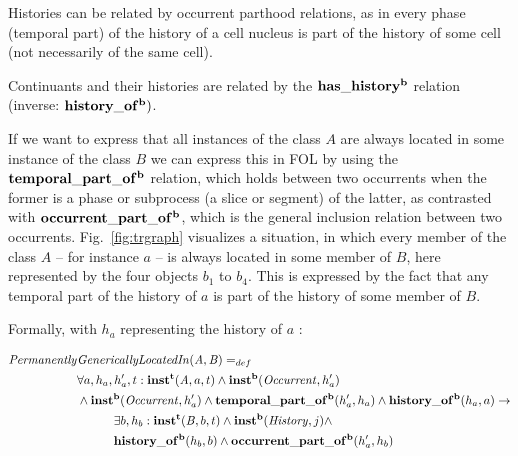Histories can be related by occurrent parthood relations, as in every phase (temporal part) 
of the history of a cell nucleus is part of the history of some cell (not necessarily of the same cell).  

Continuants and their histories are related by the $\mathrm{\mathbf{has\_history^b}}$ relation 
(inverse: $\mathrm{\mathbf{history\_of^b}})$.

If we want to express that all instances of the class $A$ are always located in some instance of the 
class $B$ we can express this in FOL by using the $\mathrm{\mathbf{temporal\_part\_of^b}}$ relation, which holds 
between two occurrents when the former is a phase or subprocess (a slice or 
segment) of the latter, as contrasted with $\mathrm{\mathbf{occurrent\_part\_of^b}}$, which is the general inclusion relation between two 
occurrents. Fig.\ \ref{fig:trgraph} visualizes a situation, in which every member of the class $A$ 
-- for instance $a$ -- is always located in some member of $B$, here represented by the 
four objects $b_1$ to $b_4$. This is expressed by the fact that any temporal part of the history of $a$ 
is part of the history of some member of $B$. 


Formally, with $h_a$ representing the history of $a$ :

\begin{equation}
\begin{split}
\mathit{Permanently} & \mathit{GenericallyLocatedIn}(\mathit{A},\mathit{B})  =_{def}  \\
& \forall a, h_a, h_a', t: \mathrm{\mathbf{inst^t}}(\mathit{A}, a, t) \wedge \mathrm{\mathbf{inst^b}}(\mathit{Occurrent},h_a') \\
& \wedge \mathrm{\mathbf{inst^b}}(\mathit{Occurrent},h_a') \wedge \mathrm{\mathbf{temporal\_part\_of^b}}(h_a', h_a) \wedge \mathrm{\mathbf{history\_of^b}}(h_a, a) \rightarrow \\
& \quad \quad \quad \exists b, h_b: \mathrm{\mathbf{inst^t}}(\mathit{B}, b, t) \wedge \mathrm{\mathbf{inst^b}}(\mathit{History},j) \wedge \\
& \quad \quad \quad \mathrm{\mathbf{history\_of^b}}(h_b, b) \wedge  \mathrm{\mathbf{occurrent\_part\_of^b}}(h_a', h_b) 
\end{split}
\label{eq:history:PartOf}
\end{equation}




